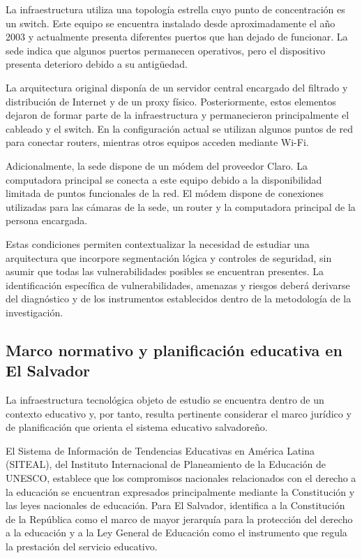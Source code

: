 La infraestructura utiliza una topología estrella cuyo punto de concentración es un switch. Este equipo se encuentra instalado desde aproximadamente el año 2003 y actualmente presenta diferentes puertos que han dejado de funcionar. La sede indica que algunos puertos permanecen operativos, pero el dispositivo presenta deterioro debido a su antigüedad.

La arquitectura original disponía de un servidor central encargado del filtrado y distribución de Internet y de un proxy físico. Posteriormente, estos elementos dejaron de formar parte de la infraestructura y permanecieron principalmente el cableado y el switch. En la configuración actual se utilizan algunos puntos de red para conectar routers, mientras otros equipos acceden mediante Wi-Fi.

Adicionalmente, la sede dispone de un módem del proveedor Claro. La computadora principal se conecta a este equipo debido a la disponibilidad limitada de puntos funcionales de la red. El módem dispone de conexiones utilizadas para las cámaras de la sede, un router y la computadora principal de la persona encargada.

Estas condiciones permiten contextualizar la necesidad de estudiar una arquitectura que incorpore segmentación lógica y controles de seguridad, sin asumir que todas las vulnerabilidades posibles se encuentran presentes. La identificación específica de vulnerabilidades, amenazas y riesgos deberá derivarse del diagnóstico y de los instrumentos establecidos dentro de la metodología de la investigación.

\subsection{Marco normativo y planificación educativa en El Salvador}

La infraestructura tecnológica objeto de estudio se encuentra dentro de un contexto educativo y, por tanto, resulta pertinente considerar el marco jurídico y de planificación que orienta el sistema educativo salvadoreño.

El Sistema de Información de Tendencias Educativas en América Latina (SITEAL), del Instituto Internacional de Planeamiento de la Educación de UNESCO, establece que los compromisos nacionales relacionados con el derecho a la educación se encuentran expresados principalmente mediante la Constitución y las leyes nacionales de educación. Para El Salvador, identifica a la Constitución de la República como el marco de mayor jerarquía para la protección del derecho a la educación y a la Ley General de Educación como el instrumento que regula la prestación del servicio educativo.

